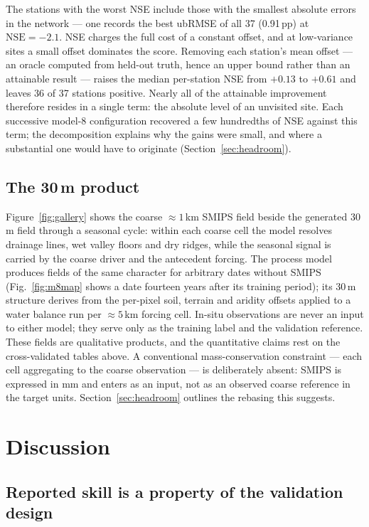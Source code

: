 \documentclass[11pt,a4paper]{article}
\newcommand{\nse}{\mathrm{NSE}}
\begin{document}
The stations with the worst NSE include those with the smallest absolute
errors in the network --- one records the best ubRMSE of all 37 (0.91\,pp) at
$\nse = -2.1$. NSE charges the full cost of a constant offset, and at
low-variance sites a small offset dominates the score. Removing each station's
mean offset --- an oracle computed from held-out truth, hence an upper bound
rather than an attainable result --- raises the median per-station NSE from
$+0.13$ to $+0.61$ and leaves 36 of 37 stations positive. Nearly all of the
attainable improvement therefore resides in a single term: the absolute level
of an unvisited site. Each successive model-8 configuration recovered a few
hundredths of NSE against this term; the decomposition explains why the gains
were small, and where a substantial one would have to originate
(Section~\ref{sec:headroom}).

\subsection{The 30\,m product}\label{sec:product}

Figure~\ref{fig:gallery} shows the coarse ${\approx}1$\,km SMIPS field beside
the generated 30\,m field through a seasonal cycle: within each coarse cell
the model resolves drainage lines, wet valley floors and dry ridges, while the
seasonal signal is carried by the coarse driver and the antecedent forcing.
The process model produces fields of the same character for arbitrary dates
without SMIPS (Fig.~\ref{fig:m8map} shows a date fourteen years after its
training period); its 30\,m structure derives from the per-pixel soil, terrain
and aridity offsets applied to a water balance run per ${\approx}5$\,km
forcing cell. In-situ observations are never an input to either model; they
serve only as the training label and the validation reference. These fields
are qualitative products, and the quantitative claims rest on the
cross-validated tables above. A conventional mass-conservation constraint ---
each cell aggregating to the coarse observation --- is deliberately absent:
SMIPS is expressed in mm and enters as an input, not as an observed coarse
reference in the target units. Section~\ref{sec:headroom} outlines the
rebasing this suggests.

\section{Discussion}\label{sec:discussion}

\subsection{Reported skill is a property of the validation design}\label{sec:harness}
\end{document}
